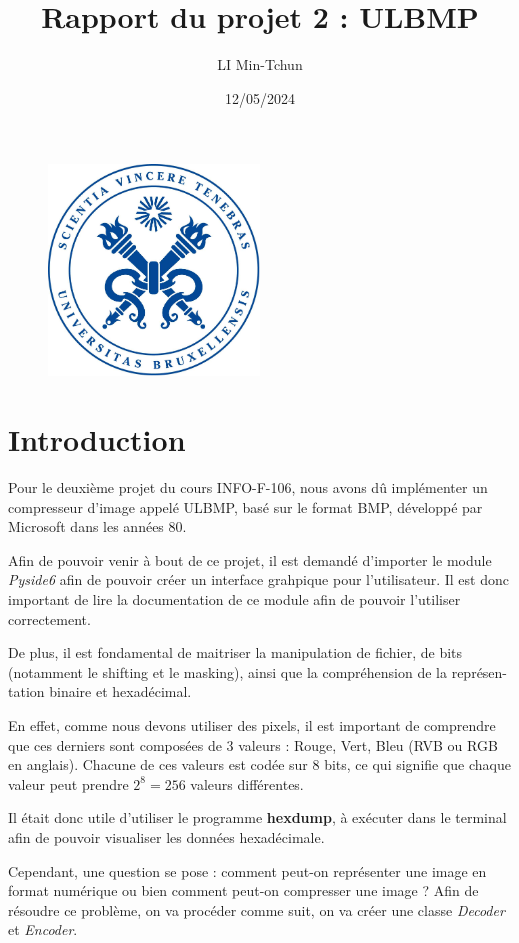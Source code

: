 \documentclass[utf8]{article}
\title{Rapport du projet 2 : ULBMP}
\author{LI Min-Tchun}
\date{12/05/2024}
\begin{document}
\maketitle
\begin{figure}[H]
\centering
\includegraphics[width=0.5\textwidth]{logo.png}
\label{fig:logo}
\end{figure}

\newpage
\tableofcontents
\newpage
\section{Introduction}
Pour le deuxième projet du cours INFO-F-106, nous avons dû implémenter un compresseur d'image appelé ULBMP, basé sur le format BMP, développé par Microsoft dans les années 80.

Afin de pouvoir venir à bout de ce projet, il est demandé d'importer le module \textit{Pyside6} afin de pouvoir créer un interface grahpique pour l'utilisateur. Il est donc important de lire la documentation de ce module afin de pouvoir l'utiliser correctement.

De plus, il est fondamental de maitriser la manipulation de fichier, de bits (notamment le shifting et le masking), ainsi que la compréhension de la représen-tation binaire et hexadécimal.

En effet, comme nous devons utiliser des pixels, il est important de comprendre que ces derniers sont composées de 3 valeurs : Rouge, Vert, Bleu (RVB ou RGB en anglais). Chacune de ces valeurs est codée sur 8 bits, ce qui signifie que chaque valeur peut prendre $2^8 = 256$ valeurs différentes.


Il était donc utile d'utiliser le programme \textbf{hexdump}, à exécuter dans le terminal afin de pouvoir visualiser les données hexadécimale.

Cependant, une question se pose : comment peut-on représenter une image en format numérique ou bien comment peut-on compresser une image ? Afin de résoudre ce problème, on va procéder comme suit, on va créer une classe \textit{Decoder} et \textit{Encoder}. 
\end{document}

